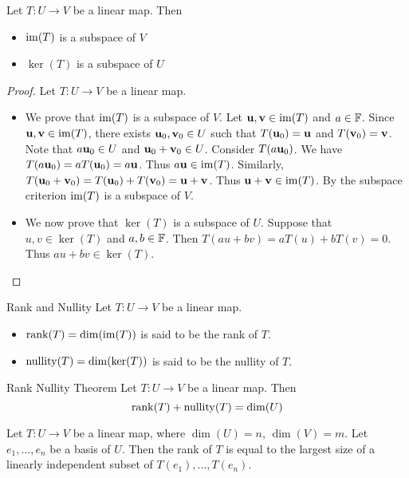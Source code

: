 \documentclass[a4paper]{article}
\begin{document}
\begin{thm}{}{} Let $T:U\to V$ be a linear map. Then
\begin{itemize}
\item $\operatorname{im}(T)$ is a subspace of $V$
\item $\ker(T)$ is a subspace of $U$
\end{itemize}\tcbline
\begin{proof} Let $T:U\to V$ be a linear map. 
\begin{itemize}
\item We prove that $\operatorname{im}(T)$ is a subspace of $V$. Let $\vb{u},\vb{v}\in\operatorname{im}(T)$ and $a\in\mathbb{F}$. Since $\vb{u},\vb{v}\in\operatorname{im}(T)$, there exists $\vb{u}_0,\vb{v}_0\in U$ such that $T(\vb{u}_0)=\vb{u}$ and $T(\vb{v}_0)=\vb{v}$. Note that $a\vb{u}_0\in U$ and $\vb{u}_0+\vb{v}_0\in U$. Consider $T(a\vb{u}_0)$. We have $T(a\vb{u}_0)=aT(\vb{u}_0)=a\vb{u}$. Thus $a\vb{u}\in\operatorname{im}(T)$. Similarly, $T(\vb{u}_0+\vb{v}_0)=T(\vb{u}_0)+T(\vb{v}_0)=\vb{u}+\vb{v}$. Thus $\vb{u}+\vb{v}\in\operatorname{im}(T)$. By the subspace criterion $\operatorname{im}(T)$ is a subspace of $V$. 
\item We now prove that $\ker(T)$ is a subspace of $U$. Suppose that $u,v\in\ker(T)$ and $a,b\in\mathbb{F}$. Then $T(au+bv)=aT(u)+bT(v)=0$. Thus $au+bv\in\ker(T)$. 
\end{itemize}
\end{proof}
\end{thm}

\begin{defn}{Rank and Nullity}{} Let $T:U\to V$ be a linear map. 
\begin{itemize}
\item $\rank(T)=\dim(\operatorname{im}(T))$ is said to be the rank of $T$. 
\item $\operatorname{nullity}(T)=\dim(\ker(T))$ is said to be the nullity of $T$. 
\end{itemize}
\end{defn}

\begin{thm}{Rank Nullity Theorem}{} Let $T:U\to V$ be a linear map. Then $$\rank(T)+\operatorname{nullity}(T)=\dim(U)$$
\end{thm}

\begin{thm}{}{} Let $T:U\to V$ be a linear map, where $\dim(U)=n$, $\dim(V)=m$. Let $e_1,\dots,e_n$ be a basis of $U$. Then the rank of $T$ is equal to the largest size of a linearly independent subset of $T(e_1),\dots,T(e_n)$. 
\end{thm}
\end{document}
